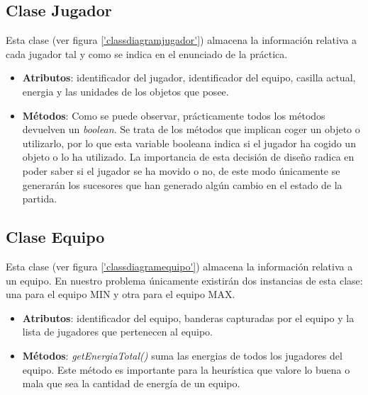 
\subsection {Clase Jugador}
Esta clase (ver figura \ref{'classdiagramjugador'}) almacena la
información relativa a cada jugador tal y como se indica en el
enunciado de la práctica.
\begin{itemize}
\item \textbf{Atributos}: identificador del jugador, identificador del
  equipo, casilla actual, energia y las unidades de los objetos que posee.
\item \textbf{Métodos}: Como se puede observar, prácticamente todos
  los métodos devuelven un \emph{boolean}. Se trata de los métodos que
  implican coger un objeto o utilizarlo, por lo que esta variable booleana
  indica si el jugador ha cogido un objeto o lo ha utilizado. La
  importancia de esta decisión de diseño radica en poder saber si el
  jugador se ha movido o no, de este modo únicamente se generarán los
  sucesores que han generado algún cambio en el estado de la partida.
\end{itemize}


\subsection {Clase Equipo}
Esta clase (ver figura \ref{'classdiagramequipo'}) almacena la
información relativa a un equipo. En nuestro problema únicamente
existirán dos instancias de esta clase: una para el equipo MIN y otra
para el equipo MAX.
\begin{itemize}
\item \textbf{Atributos}: identificador del equipo, banderas
  capturadas por el equipo y la lista de jugadores que pertenecen al equipo.
\item \textbf{Métodos}: \emph{getEnergiaTotal()} suma las energias de
  todos los jugadores del equipo. Este método es importante para la
  heurística que valore lo buena o mala que sea la cantidad de energía
  de un equipo.
\end{itemize}


